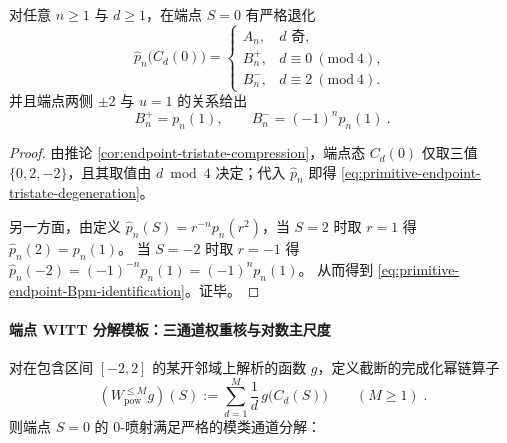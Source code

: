 \begin{proposition}\label{prop:primitive-endpoint-tristate-degeneration}
对任意 \(n\ge 1\) 与 \(d\ge 1\)，在端点 \(S=0\) 有严格退化
\begin{equation}\label{eq:primitive-endpoint-tristate-degeneration}
\boxed{\;
\widehat p_n\!\bigl(C_d(0)\bigr)=
\begin{cases}
A_n, & d \text{ 奇},\\
B_n^{+}, & d\equiv 0\ (\mathrm{mod}\ 4),\\
B_n^{-}, & d\equiv 2\ (\mathrm{mod}\ 4).
\end{cases}\;}
\end{equation}
并且端点两侧 \(\pm 2\) 与 \(u=1\) 的关系给出
\begin{equation}\label{eq:primitive-endpoint-Bpm-identification}
\boxed{\ B_n^{+}=p_n(1),\qquad B_n^{-}=(-1)^n p_n(1)\ }.
\end{equation}
\end{proposition}
\begin{proof}
由推论 \ref{cor:endpoint-tristate-compression}，端点态 \(C_d(0)\) 仅取三值 \(\{0,2,-2\}\)，且其取值由 \(d\bmod 4\) 决定；代入 \(\widehat p_n\) 即得 \eqref{eq:primitive-endpoint-tristate-degeneration}。
\par
另一方面，由定义 \(\widehat p_n(S)=r^{-n}p_n(r^2)\)，当 \(S=2\) 时取 \(r=1\) 得 \(\widehat p_n(2)=p_n(1)\)。
当 \(S=-2\) 时取 \(r=-1\) 得 \(\widehat p_n(-2)=(-1)^{-n}p_n(1)=(-1)^n p_n(1)\)。
从而得到 \eqref{eq:primitive-endpoint-Bpm-identification}。证毕。
\end{proof}

\paragraph{端点 WITT 分解模板：三通道权重核与对数主尺度}
对在包含区间 \([-2,2]\) 的某开邻域上解析的函数 \(g\)，定义截断的完成化幂链算子
\begin{equation}\label{eq:completed-witt-pow-operator-trunc}
\boxed{\;
(W_{\mathrm{pow}}^{\le M}g)(S):=\sum_{d=1}^{M}\frac{1}{d}\,g\!\bigl(C_d(S)\bigr)\qquad(M\ge 1)\; }.
\end{equation}
则端点 \(S=0\) 的 \(0\)-喷射满足严格的模类通道分解：

